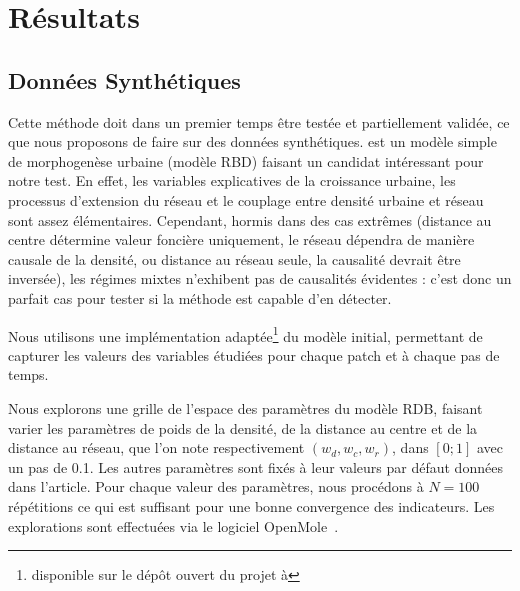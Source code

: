 \documentclass[french]{./sageo}
\begin{document}







\section{Résultats}


\subsection{Données Synthétiques}

Cette méthode doit dans un premier temps être testée et partiellement validée, ce que nous proposons de faire sur des données synthétiques. %
 \cite{raimbault2014hybrid} est un modèle simple de morphogenèse urbaine (modèle RBD) faisant un candidat intéressant pour notre test. En effet, les variables explicatives de la croissance urbaine, les processus d'extension du réseau et le couplage entre densité urbaine et réseau sont assez élémentaires. Cependant, hormis dans des cas extrêmes (distance au centre détermine valeur foncière uniquement, le réseau dépendra de manière causale de la densité, ou distance au réseau seule, la causalité devrait être inversée), les régimes mixtes n'exhibent pas de causalités évidentes : c'est donc un parfait cas pour tester si la méthode est capable d'en détecter.

Nous utilisons une implémentation adaptée\footnote{disponible sur le dépôt ouvert du projet à \texttt{}} du modèle initial, permettant de capturer les valeurs des variables étudiées pour chaque patch et à chaque pas de temps.

Nous explorons une grille de l'espace des paramètres du modèle RDB, faisant varier les paramètres de poids de la densité, de la distance au centre et de la distance au réseau, que l'on note respectivement $(w_{d},w_{c},w_{r})$, dans $\left[0;1\right]$ avec un pas de 0.1. Les autres paramètres sont fixés à leur valeurs par défaut données dans l'article. Pour chaque valeur des paramètres, nous procédons à $N=100$ répétitions ce qui est suffisant pour une bonne convergence des indicateurs. Les explorations sont effectuées via le logiciel OpenMole~\cite{reuillon2013openmole}.
\end{document}
